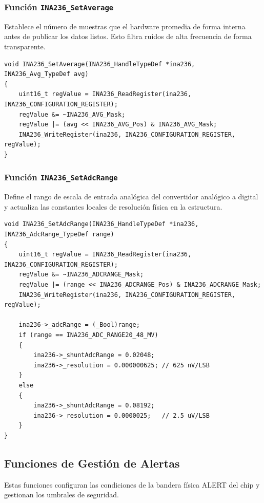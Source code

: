 \documentclass[
10pt, %
a4paper, %
oneside, %
headinclude,footinclude, %
BCOR5mm, %
]{scrartcl}
\begin{document}
\subsubsection{Función \texttt{INA236\_SetAverage}}
Establece el número de muestras que el hardware promedia de forma interna antes de publicar los datos listos. Esto filtra ruidos de alta frecuencia de forma transparente.
\begin{lstlisting}[style=CMakeStyle]
void INA236_SetAverage(INA236_HandleTypeDef *ina236, INA236_Avg_TypeDef avg)
{
    uint16_t regValue = INA236_ReadRegister(ina236, INA236_CONFIGURATION_REGISTER);
    regValue &= ~INA236_AVG_Mask;
    regValue |= (avg << INA236_AVG_Pos) & INA236_AVG_Mask;
    INA236_WriteRegister(ina236, INA236_CONFIGURATION_REGISTER, regValue);
}
\end{lstlisting}

\subsubsection{Función \texttt{INA236\_SetAdcRange}}
Define el rango de escala de entrada analógica del convertidor analógico a digital y actualiza las constantes locales de resolución física en la estructura.
\begin{lstlisting}[style=CMakeStyle]
void INA236_SetAdcRange(INA236_HandleTypeDef *ina236, INA236_AdcRange_TypeDef range)
{
    uint16_t regValue = INA236_ReadRegister(ina236, INA236_CONFIGURATION_REGISTER);
    regValue &= ~INA236_ADCRANGE_Mask;
    regValue |= (range << INA236_ADCRANGE_Pos) & INA236_ADCRANGE_Mask;
    INA236_WriteRegister(ina236, INA236_CONFIGURATION_REGISTER, regValue);
    
    ina236->_adcRange = (_Bool)range;
    if (range == INA236_ADC_RANGE20_48_MV)
    {
        ina236->_shuntAdcRange = 0.02048;
        ina236->_resolution = 0.000000625; // 625 nV/LSB
    }
    else
    {
        ina236->_shuntAdcRange = 0.08192;
        ina236->_resolution = 0.0000025;   // 2.5 uV/LSB
    }
}
\end{lstlisting}

\subsection{Funciones de Gestión de Alertas}
Estas funciones configuran las condiciones de la bandera física ALERT del chip y gestionan los umbrales de seguridad.
\end{document}
